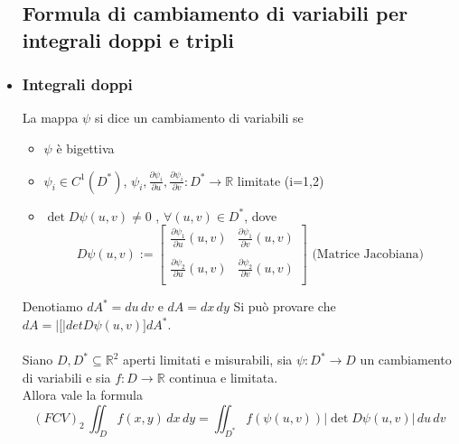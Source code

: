 \documentclass{report}
\newcommand{\ace}{\`e }
\newcommand{\aco}{\`o }
\newcommand{\Ins}[1]{\mathbb{#1}}
\newcommand{\R}{\Ins{R}}
\newcommand{\abs}[1]{\left\lvert #1 \right\rvert}
\newcommand{\p}{\partial}
\begin{document}
\begin{itemize}
  \subsection{Formula di cambiamento di variabili per integrali doppi e tripli}
  \item \subsubsection{Integrali doppi}
        La mappa $\psi$ si dice un cambiamento di variabili se
        \begin{itemize}
          \item $\psi$ \ace bigettiva
          \item $\psi_i \in C^1(D^*)$, $\psi_i, \frac{\p \psi_i}{\p u}, \frac{\p \psi_i}{\p v} : D^* \to \R$ limitate (i=1,2)
          \item $\det D\psi(u,v)\not = 0$ , $\forall (u,v)\in D^*$, dove
                $$D \psi(u,v) := \begin{bmatrix}
                  \frac{\p \psi_1}{\p u} (u,v) & \frac{\p \psi_1}{\p v} (u,v)\\
                  \\
                  \frac{\p \psi_2}{\p u} (u,v) & \frac{\p \psi_2}{\p v} (u,v) \\
                \end{bmatrix} \text{ (Matrice Jacobiana)}$$
        \end{itemize}
        Denotiamo $dA^* = du\,dv$ e $dA = dx\,dy$
      Si pu\aco provare che $dA = \abs[det D\psi(u,v)] dA^*$.\\\\
      Siano $D, D^* \subseteq \R^2$ aperti limitati e misurabili, sia $\psi : D^* \to D$
      un cambiamento di variabili e sia $f:D \to \R$ continua e limitata. \\
      Allora vale la formula
      $$(FCV)_2 \, \iint_{D} f(x,y) \,dx\,dy = \iint_{D^*} f(\psi(u,v))\abs{\det D\psi(u,v)} \,du\,dv$$ 


\end{itemize}
\end{document}
